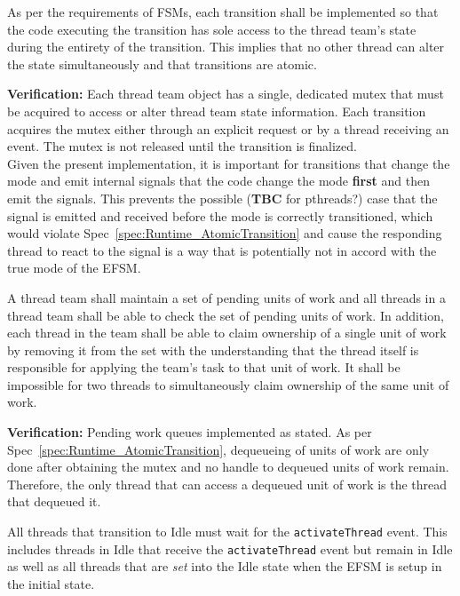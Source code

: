 \documentclass{article}
\begin{document}
\begin{spec}
\label{spec:Runtime_AtomicTransition}
As per the requirements of FSMs, each transition shall be implemented so that
the code executing the transition has sole access to the thread team's state
during the entirety of the transition.  This implies that no other thread can
alter the state simultaneously and that transitions are atomic.
\end{spec}
\textbf{Verification:}\hspace{0.125in}  Each thread team object has a single,
dedicated mutex that must be acquired to access or alter thread team state
information.  Each transition acquires the mutex either through an explicit
request or by a thread receiving an event.  The mutex is not released until
the transition is finalized.\\

Given the present implementation, it is important for transitions that
change the mode and emit internal signals that the code change the mode
\textbf{first} and then emit the signals.  This prevents the possible
(\textbf{TBC} for pthreads?) case that the signal is emitted and received before
the mode is correctly transitioned, which would violate
Spec~\ref{spec:Runtime_AtomicTransition} and cause the responding thread
to react to the signal is a way that is potentially not in accord with the true
mode of the EFSM.

\begin{spec}
A thread team shall maintain a set of pending units of work and all threads in a
thread team shall be able to check the set of pending units of work.  In
addition, each thread in the team shall be able to claim ownership of a single
unit of work by removing it from the set with the understanding that the thread
itself is responsible for applying the team's task to that unit of work.  It
shall be impossible for two threads to simultaneously claim ownership of the
same unit of work.
\end{spec}
\textbf{Verification:}\hspace{0.125in}  Pending work queues implemented as
stated.  As per Spec~\ref{spec:Runtime_AtomicTransition}, dequeueing of units of
work are only done after obtaining the mutex and no handle to dequeued units of
work remain.  Therefore, the only thread that can access a dequeued unit of work
is the thread that dequeued it.
\begin{spec}
All threads that transition to Idle must wait for the \texttt{activateThread}
event.  This includes threads in Idle that receive the \texttt{activateThread}
event but remain in Idle as well as all threads that are \textit{set} into the
Idle state when the EFSM is setup in the initial state.
\label{spec:IdleActivateThread}
\end{spec}
\end{document}
